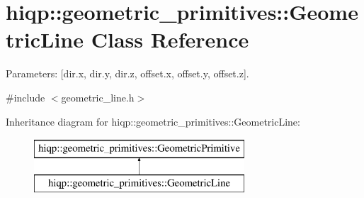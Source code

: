 \hypertarget{classhiqp_1_1geometric__primitives_1_1GeometricLine}{\section{hiqp\-:\-:geometric\-\_\-primitives\-:\-:Geometric\-Line Class Reference}
\label{classhiqp_1_1geometric__primitives_1_1GeometricLine}
}


Parameters\-: \mbox{[}dir.\-x, dir.\-y, dir.\-z, offset.\-x, offset.\-y, offset.\-z\mbox{]}.  




{\ttfamily \#include $<$geometric\-\_\-line.\-h$>$}

Inheritance diagram for hiqp\-:\-:geometric\-\_\-primitives\-:\-:Geometric\-Line\-:\begin{figure}[H]
\begin{center}
\leavevmode
\includegraphics[height=2.000000cm]{classhiqp_1_1geometric__primitives_1_1GeometricLine}
\end{center}
\end{figure}
